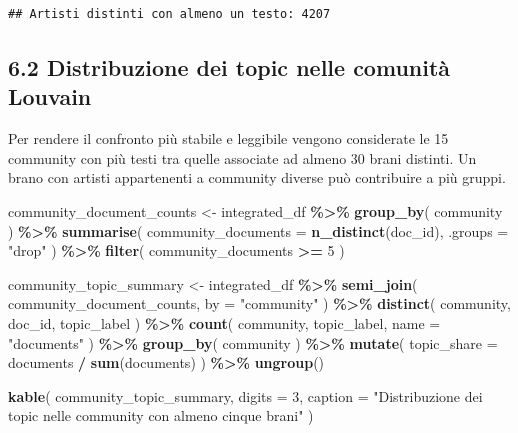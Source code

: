 \documentclass[
]{article}
\newenvironment{Shaded}{\begin{snugshade}}{\end{snugshade}}
\newcommand{\AttributeTok}[1]{\textcolor[rgb]{0.13,0.29,0.53}{#1}}
\newcommand{\DecValTok}[1]{\textcolor[rgb]{0.00,0.00,0.81}{#1}}
\newcommand{\FunctionTok}[1]{\textcolor[rgb]{0.13,0.29,0.53}{\textbf{#1}}}
\newcommand{\NormalTok}[1]{#1}
\newcommand{\OtherTok}[1]{\textcolor[rgb]{0.56,0.35,0.01}{#1}}
\newcommand{\SpecialCharTok}[1]{\textcolor[rgb]{0.81,0.36,0.00}{\textbf{#1}}}
\newcommand{\StringTok}[1]{\textcolor[rgb]{0.31,0.60,0.02}{#1}}
\begin{document}
\begin{verbatim}
## Artisti distinti con almeno un testo: 4207
\end{verbatim}

\subsection{6.2 Distribuzione dei topic nelle comunità
Louvain}\label{distribuzione-dei-topic-nelle-comunituxe0-louvain}

Per rendere il confronto più stabile e leggibile vengono considerate le
15 community con più testi tra quelle associate ad almeno 30 brani
distinti. Un brano con artisti appartenenti a community diverse può
contribuire a più gruppi.

\begin{Shaded}
\begin{Highlighting}[]
\NormalTok{community\_document\_counts }\OtherTok{\textless{}{-}}\NormalTok{ integrated\_df }\SpecialCharTok{\%\textgreater{}\%}
  \FunctionTok{group\_by}\NormalTok{(}
\NormalTok{    community}
\NormalTok{    ) }\SpecialCharTok{\%\textgreater{}\%}
  \FunctionTok{summarise}\NormalTok{(}
    \AttributeTok{community\_documents =} \FunctionTok{n\_distinct}\NormalTok{(doc\_id),}
    \AttributeTok{.groups =} \StringTok{"drop"}
\NormalTok{  ) }\SpecialCharTok{\%\textgreater{}\%}
  \FunctionTok{filter}\NormalTok{(}
\NormalTok{    community\_documents }\SpecialCharTok{\textgreater{}=} \DecValTok{5}
\NormalTok{  )}

\NormalTok{community\_topic\_summary }\OtherTok{\textless{}{-}}\NormalTok{ integrated\_df }\SpecialCharTok{\%\textgreater{}\%}
  \FunctionTok{semi\_join}\NormalTok{(}
\NormalTok{    community\_document\_counts,}
            \AttributeTok{by =} \StringTok{"community"}
\NormalTok{    ) }\SpecialCharTok{\%\textgreater{}\%}
  \FunctionTok{distinct}\NormalTok{(}
\NormalTok{    community,}
\NormalTok{    doc\_id,}
\NormalTok{    topic\_label}
\NormalTok{    ) }\SpecialCharTok{\%\textgreater{}\%}
  \FunctionTok{count}\NormalTok{(}
\NormalTok{    community,}
\NormalTok{    topic\_label,}
    \AttributeTok{name =} \StringTok{"documents"}
\NormalTok{    ) }\SpecialCharTok{\%\textgreater{}\%}
  \FunctionTok{group\_by}\NormalTok{(}
\NormalTok{    community}
\NormalTok{    ) }\SpecialCharTok{\%\textgreater{}\%}
  \FunctionTok{mutate}\NormalTok{(}
    \AttributeTok{topic\_share =}\NormalTok{ documents }\SpecialCharTok{/} \FunctionTok{sum}\NormalTok{(documents)}
\NormalTok{    ) }\SpecialCharTok{\%\textgreater{}\%}
  \FunctionTok{ungroup}\NormalTok{()}

\FunctionTok{kable}\NormalTok{(}
\NormalTok{  community\_topic\_summary,}
  \AttributeTok{digits =} \DecValTok{3}\NormalTok{,}
  \AttributeTok{caption =} \StringTok{"Distribuzione dei topic nelle community con almeno cinque brani"}
\NormalTok{)}
\end{Highlighting}
\end{Shaded}
\end{document}
